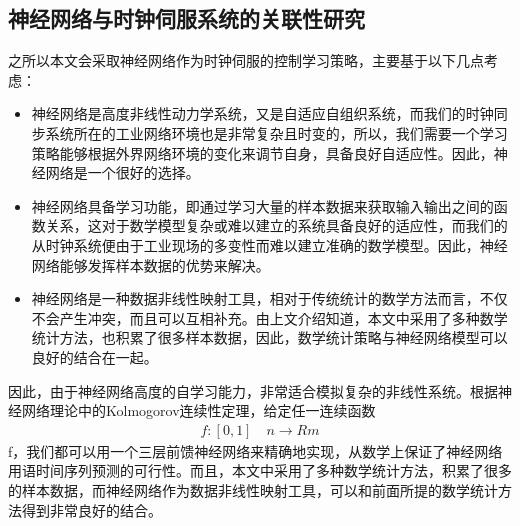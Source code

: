 \subsection{神经网络与时钟伺服系统的关联性研究}
之所以本文会采取神经网络作为时钟伺服的控制学习策略，主要基于以下几点考虑：
\begin{itemize}[noitemsep,topsep=0pt,parsep=0pt,partopsep=0pt]
	\item 神经网络是高度非线性动力学系统，又是自适应自组织系统，而我们的时钟同步系统所在的工业网络环境也是非常复杂且时变的，所以，我们需要一个学习策略能够根据外界网络环境的变化来调节自身，具备良好自适应性\supercite{64}。因此，神经网络是一个很好的选择。
	\item 神经网络具备学习功能，即通过学习大量的样本数据来获取输入输出之间的函数关系，这对于数学模型复杂或难以建立的系统具备良好的适应性，而我们的从时钟系统便由于工业现场的多变性而难以建立准确的数学模型。因此，神经网络能够发挥样本数据的优势来解决。
	\item 神经网络是一种数据非线性映射工具，相对于传统统计的数学方法而言，不仅不会产生冲突，而且可以互相补充\supercite{68}。由上文介绍知道，本文中采用了多种数学统计方法，也积累了很多样本数据，因此，数学统计策略与神经网络模型可以良好的结合在一起。
\end{itemize}

因此，由于神经网络高度的自学习能力，非常适合模拟复杂的非线性系统。根据神经网络理论中的Kolmogorov连续性定理，给定任一连续函数
\begin{align}
f:[0,1] \quad n \rightarrow Rm
\end{align}
f，我们都可以用一个三层前馈神经网络来精确地实现，从数学上保证了神经网络用语时间序列预测的可行性。而且，本文中采用了多种数学统计方法，积累了很多的样本数据，而神经网络作为数据非线性映射工具，可以和前面所提的数学统计方法得到非常良好的结合。

